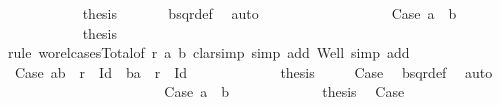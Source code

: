 \begin{isabellebody}
\ \ \ \ \ \ \ \ \ \isamarkupfalse%
\ {\isacharquery}{\kern0pt}thesis\ \isamarkupfalse%
\ {}\ {}\ {}\ \isamarkupfalse%
\ bsqr{\isacharunderscore}{\kern0pt}def\ \isamarkupfalse%
\ auto\isanewline
\ \ \ \ \ \ \ \isamarkupfalse%
\isanewline
\ \ \ \ \ \ \ \ \ \isamarkupfalse%
\ Case{}{}{}{\isacharcolon}{\kern0pt}\ {\isachardoublequoteopen}a{}\ {\isacharequal}{\kern0pt}\ b{}{\isachardoublequoteclose}\isanewline
\ \ \ \ \ \ \ \ \ \isamarkupfalse%
\ {\isacharquery}{\kern0pt}thesis\isanewline
\ \ \ \ \ \ \ \ \ \isamarkupfalse%
{\isacharparenleft}{\kern0pt}rule\ wo{\isacharunderscore}{\kern0pt}rel{\isachardot}{\kern0pt}cases{\isacharunderscore}{\kern0pt}Total{}{\isacharbrackleft}{\kern0pt}of\ r\ a{}\ b{}{\isacharbrackright}{\kern0pt}{\isacharcomma}{\kern0pt}\ clarsimp\ simp\ add{\isacharcolon}{\kern0pt}\ Well{\isacharcomma}{\kern0pt}\ simp\ add{\isacharcolon}{\kern0pt}\ {}{\isacharparenright}{\kern0pt}\isanewline
\ \ \ \ \ \ \ \ \ \ \ \isamarkupfalse%
\ Case{}{}{}{}{\isacharcolon}{\kern0pt}\ {\isachardoublequoteopen}{\isacharparenleft}{\kern0pt}a{}{\isacharcomma}{\kern0pt}b{}{\isacharparenright}{\kern0pt}\ {\isasymin}\ r\ {\isacharminus}{\kern0pt}\ Id\ {\isasymor}\ {\isacharparenleft}{\kern0pt}b{}{\isacharcomma}{\kern0pt}a{}{\isacharparenright}{\kern0pt}\ {\isasymin}\ r\ {\isacharminus}{\kern0pt}\ Id{\isachardoublequoteclose}\isanewline
\ \ \ \ \ \ \ \ \ \ \ \isamarkupfalse%
\ {\isacharquery}{\kern0pt}thesis\ \isamarkupfalse%
\ {}\ {}\ {}\ Case{}{}{}\ \isamarkupfalse%
\ bsqr{\isacharunderscore}{\kern0pt}def\ \isamarkupfalse%
\ auto\isanewline
\ \ \ \ \ \ \ \ \ \isamarkupfalse%
\isanewline
\ \ \ \ \ \ \ \ \ \ \ \isamarkupfalse%
\ Case{}{}{}{}{\isacharcolon}{\kern0pt}\ {\isachardoublequoteopen}a{}\ {\isacharequal}{\kern0pt}\ b{}{\isachardoublequoteclose}\isanewline
\ \ \ \ \ \ \ \ \ \ \ \isamarkupfalse%
\ {\isacharquery}{\kern0pt}thesis\ \isamarkupfalse%
\ Case{}{}{}\ \isamarkupfalse%

\end{isabellebody}
